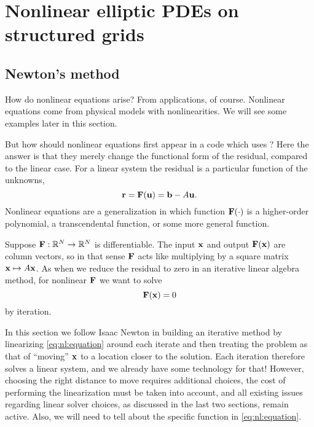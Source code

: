 \renewcommand{\CODELOC}{c/ch4/}

\chapter{Nonlinear elliptic PDEs on structured grids}
\label{chap:nonlinear}

\section{Newton's method}

How do nonlinear equations arise?  From applications, of course.  Nonlinear equations come from physical models with nonlinearities.  We will see some examples later in this section.

But how should nonlinear equations first appear in a code which uses \PETSc?  Here the answer is that they merely change the functional form of the residual, compared to the linear case.  For a linear system the residual is a particular function of the unknowns,
\begin{equation}
\mathbf{r} = \mathbf{F}(\mathbf{u}) = \mathbf{b} - A \mathbf{u}. \label{eq:nl:linres}
\end{equation}
Nonlinear equations are a generalization in which function $\mathbf{F}(\cdot)$ is a higher-order polynomial, a transcendental function, or some more general function.

Suppose $\mathbf{F} : \mathbb{R}^N \to \mathbb{R}^N$ is differentiable.  The input $\mathbf{x}$ and output $\mathbf{F}(\mathbf{x})$ are column vectors, so in that sense $\mathbf{F}$ acts like multiplying by a square matrix $\mathbf{x}\mapsto A\mathbf{x}$.  As when we reduce the residual to zero in an iterative linear algebra method, for nonlinear $\mathbf{F}$ we want to solve
\begin{equation}
   \mathbf{F}(\mathbf{x}) = 0   \label{eq:nl:equation}
\end{equation}
by iteration.

In this section we follow Isaac Newton in building an iterative method by linearizing \eqref{eq:nl:equation} around each iterate and then treating the problem as that of ``moving'' $\mathbf{x}$ to a location closer to the solution.  Each iteration therefore solves a linear system, and we already have some technology for that!  However, choosing the right distance to move requires additional choices, the cost of performing the linearization must be taken into account, and all existing issues regarding linear solver choices, as discussed in the last two sections, remain active.  Also, we will need to tell \PETSc about the specific function in \eqref{eq:nl:equation}.

